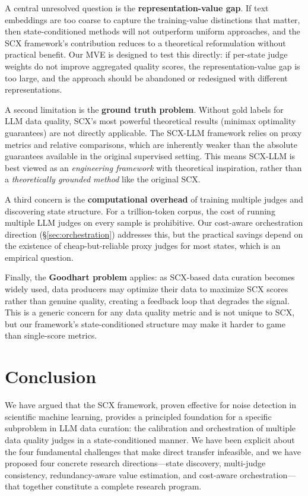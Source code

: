 \documentclass[11pt,twocolumn]{article}
\begin{document}
A central unresolved question is the \textbf{representation-value gap}. If text embeddings are too coarse to capture the training-value distinctions that matter, then state-conditioned methods will not outperform uniform approaches, and the SCX framework's contribution reduces to a theoretical reformulation without practical benefit. Our MVE is designed to test this directly: if per-state judge weights do not improve aggregated quality scores, the representation-value gap is too large, and the approach should be abandoned or redesigned with different representations.

A second limitation is the \textbf{ground truth problem}. Without gold labels for LLM data quality, SCX's most powerful theoretical results (minimax optimality guarantees) are not directly applicable. The SCX-LLM framework relies on proxy metrics and relative comparisons, which are inherently weaker than the absolute guarantees available in the original supervised setting. This means SCX-LLM is best viewed as an \textit{engineering framework} with theoretical inspiration, rather than a \textit{theoretically grounded method} like the original SCX.

A third concern is the \textbf{computational overhead} of training multiple judges and discovering state structure. For a trillion-token corpus, the cost of running multiple LLM judges on every sample is prohibitive. Our cost-aware orchestration direction (\S\ref{sec:orchestration}) addresses this, but the practical savings depend on the existence of cheap-but-reliable proxy judges for most states, which is an empirical question.

Finally, the \textbf{Goodhart problem} applies: as SCX-based data curation becomes widely used, data producers may optimize their data to maximize SCX scores rather than genuine quality, creating a feedback loop that degrades the signal. This is a generic concern for any data quality metric and is not unique to SCX, but our framework's state-conditioned structure may make it harder to game than single-score metrics.

\section{Conclusion}

We have argued that the SCX framework, proven effective for noise detection in scientific machine learning, provides a principled foundation for a specific subproblem in LLM data curation: the calibration and orchestration of multiple data quality judges in a state-conditioned manner. We have been explicit about the four fundamental challenges that make direct transfer infeasible, and we have proposed four concrete research directions---state discovery, multi-judge consistency, redundancy-aware value estimation, and cost-aware orchestration---that together constitute a complete research program.
\end{document}
